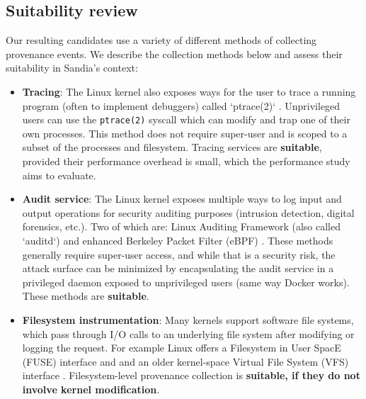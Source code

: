 \subsection{Suitability review}
\label{section:suitability-review}

Our resulting candidates use a variety of different methods of collecting provenance events.
We describe the collection methods below and assess their suitability in Sandia's context:

\begin{itemize}
\item \textbf{Tracing}:
The Linux kernel also exposes ways for the user to trace a running program (often to implement debuggers) called `ptrace(2)` \cite{noauthor_ptrace_nodate}.
Unprivileged users can use the \texttt{ptrace(2)} syscall \cite{noauthor_ptrace_nodate} which can modify and trap one of their own processes.
This method does not require super-user and is scoped to a subset of the processes and filesystem.
Tracing services are \textbf{suitable}, provided their performance overhead is small, which the performance study aims to evaluate.

\item \textbf{Audit service}:
The Linux kernel exposes multiple ways to log input and output operations for security auditing purposes (intrusion detection, digital forensics, etc.).
Two of which are: Linux Auditing Framework (also called `auditd`) and enhanced Berkeley Packet Filter (eBPF) \cite{noauthor_bpf_nodate}.
These methods generally require super-user access, and while that is a security risk, the attack surface can be minimized by encapsulating the audit service in a privileged daemon exposed to unprivileged users (same way Docker works).
These methods are \textbf{suitable}.

\item \textbf{Filesystem instrumentation}:
Many kernels support software file systems, which pass through I/O calls to an underlying file system after modifying or logging the request.
For example Linux offers a Filesystem in User SpacE (FUSE) interface \cite{noauthor_fuse_nodate} and and an older kernel-space Virtual File System (VFS) interface \cite{gooch_overview_nodate}.
Filesystem-level provenance collection is \textbf{suitable, if they do not involve kernel modification}.


\end{itemize}

